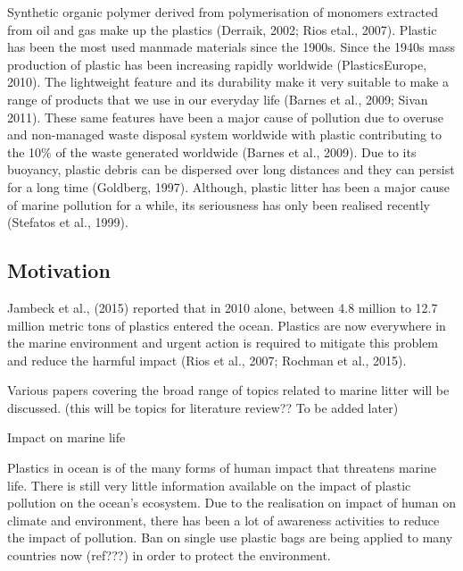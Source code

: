 \documentclass[10pt]{article}
\begin{document}
Synthetic organic polymer derived from polymerisation of monomers extracted from oil and gas make up the plastics (Derraik, 2002; Rios etal., 2007). Plastic has been the most used manmade materials since the 1900s. Since the 1940s mass production of plastic has been increasing rapidly worldwide (PlasticsEurope, 2010). The lightweight feature and its durability make it very suitable to make a range of products that we use in our everyday life (Barnes et al., 2009; Sivan 2011). These same features have been a major cause of pollution due to overuse and non-managed waste disposal system worldwide with plastic contributing to the 10\% of the waste generated worldwide (Barnes et al., 2009). Due to its buoyancy, plastic debris can be dispersed over long distances and they can persist for a long time (Goldberg, 1997). Although, plastic litter has been a major cause of marine pollution for a while, its seriousness has only been realised recently (Stefatos et al., 1999). 


\subsection{Motivation}\label{mot}
Jambeck et al., (2015) reported that in 2010 alone, between 4.8 million to 12.7 million metric tons of plastics entered the ocean. Plastics are now everywhere in the marine environment and urgent action is required to mitigate this problem and reduce the harmful impact (Rios et al., 2007; Rochman et al., 2015). 

Various papers covering the broad range of topics related to marine litter will be discussed. (this will be topics for literature review?? To be added later)

Impact on marine life

Plastics in ocean is of the many forms of human impact that threatens marine life. There is still very little information available on the impact of plastic pollution on the ocean's ecosystem. Due to the realisation on impact of human on climate and environment, there has been a lot of awareness activities to reduce the impact of pollution. Ban on single use plastic bags are being applied to many countries now (ref???) in order to protect the environment. 
\end{document}
